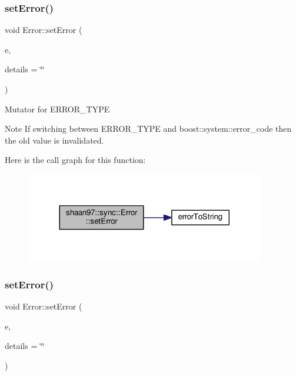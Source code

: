 \subsubsection{\texorpdfstring{set\+Error()}{setError()}\hspace{0.1cm}{\footnotesize\ttfamily [1/2]}}
{\footnotesize\ttfamily void Error\+::set\+Error (\begin{DoxyParamCaption}\item[{const \hyperlink{namespaceshaan97_1_1sync_a69f4d5572314be52626f6a1c8ecc8db9}{E\+R\+R\+O\+R\+\_\+\+T\+Y\+PE} \&}]{e,  }\item[{const std\+::string \&}]{details = {\ttfamily \char`\"{}\char`\"{}} }\end{DoxyParamCaption})}

Mutator for {\ttfamily E\+R\+R\+O\+R\+\_\+\+T\+Y\+PE} \begin{DoxyNote}{Note}
If switching between E\+R\+R\+O\+R\+\_\+\+T\+Y\+PE and boost\+::system\+::error\+\_\+code then the old value is invalidated. 
\end{DoxyNote}
Here is the call graph for this function\+:\nopagebreak
\begin{figure}[H]
\begin{center}
\leavevmode
\includegraphics[width=296pt]{classshaan97_1_1sync_1_1_error_abd07d5a3c98e8310160b1c13b1b08049_cgraph}
\end{center}
\end{figure}
\mbox{\label{classshaan97_1_1sync_1_1_error_a6be9dc27fe05da94cdc58fb1e5256e87}} 
\subsubsection{\texorpdfstring{set\+Error()}{setError()}\hspace{0.1cm}{\footnotesize\ttfamily [2/2]}}
{\footnotesize\ttfamily void Error\+::set\+Error (\begin{DoxyParamCaption}\item[{const boost\+::system\+::error\+\_\+code \&}]{e,  }\item[{const std\+::string \&}]{details = {\ttfamily \char`\"{}\char`\"{}} }\end{DoxyParamCaption})}

